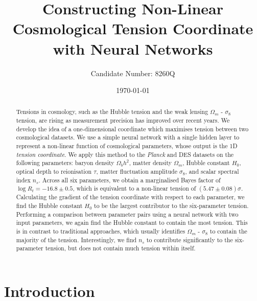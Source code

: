 \documentclass[%
 reprint,
 amsmath,amssymb,
 aps,
]{revtex4-2}
\begin{document}

\title{Constructing Non-Linear Cosmological Tension Coordinate with Neural Networks}

\author{Candidate Number: 8260Q}


\date{\today}

\begin{abstract}
Tensions in cosmology, such as the Hubble tension and the weak lensing $\Omega_m$ - $\sigma_8$ tension, are rising as measurement precision has improved over recent years. We develop the idea of a one-dimensional coordinate which maximises tension between two cosmological datasets. We use a simple neural network with a single hidden layer to represent a non-linear function of cosmological parameters, whose output is the 1D \textit{tension coordinate}. We apply this method to the \textit{Planck} and DES datasets on the following parameters: baryon density $\Omega_b h^2$, matter density $\Omega_m$, Hubble constant $H_0$, optical depth to reionisation $\tau$, matter fluctuation amplitude $\sigma_8$, and scalar spectral index $n_s$. Across all six parameters, we obtain a marginalised Bayes factor of $\log R_t = -16.8 \pm 0.5$, which is equivalent to a non-linear tension of $(5.47 \pm 0.08)\sigma$. Calculating the gradient of the tension coordinate with respect to each parameter, we find the Hubble constant $H_0$ to be the largest contributor to the six-parameter tension. Performing a comparison between parameter pairs using a neural network with two input parameters, we again find the Hubble constant to contain the most tension. This is in contrast to traditional approaches, which usually identifies $\Omega_m$ - $\sigma_8$ to contain the majority of the tension. Interestingly, we find $n_s$ to contribute significantly to the six-parameter tension, but does not contain much tension within itself.

\end{abstract}

\maketitle



\section{Introduction} \label{intro}
\end{document}
